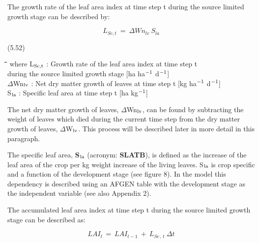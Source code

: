 The growth rate of the leaf area index at time step t during the source limited growth 
stage can be described by:

\begin{displaymath}
L _{Sc,t} ~=~\Delta Wn _{lv} ~S _{la} 
\end{displaymath}

 
\strut\hfill (5.52)
\nwln
\begin{tabbing}
\hspace{1.27cm}\=\hspace{1.27cm}\=\hspace{1.27cm}\=\hspace{1.27cm}\=%
\hspace{1.27cm}\=\hspace{1.27cm}\=\hspace{1.27cm}\=\hspace{1.27cm}\=%
\hspace{1.27cm}\=\hspace{1.27cm}\=\kill
where L$_{{\rm Sc,t}}$ : Growth rate of the leaf area index at time step t\\
   during the source limited growth stage         [ha ha$^{{\rm -1}}$ d$^{{\rm -1}}$]\\
$\Delta$Wn$_{{\rm lv}}$ : Net dry matter growth of leaves at time step t        [kg ha$^{{\rm -1}}$ d$^{{\rm -1}}$]\\
S$_{{\rm la}}$ : Specific leaf area at time step t        [ha kg$^{{\rm -1}}$]
\end{tabbing}

 
The net dry matter growth of leaves, $\Delta$Wn$_{{\rm lv}}$, can be found by subtracting the weight of
leaves which died during the current time step from the dry matter growth of leaves,
$\Delta$W$_{{\rm lv}}$. This process will be described later in more detail in this paragraph.


The specific leaf area, {\bf S$_{{\rm la}}$} (acronym: {\bf SLATB}), is defined as the increase of the leaf area
of the crop per kg weight increase of the living leaves. S$_{{\rm la}}$ is crop specific and a function
of the development stage (see figure 8). In the model this dependency is described using
an AFGEN table with the development stage as the independent variable (see also
Appendix 2).



 The accumulated leaf area index at time step t during the source limited growth stage can
be described as:

\begin{displaymath}
LAI _{t~} =~LAI _{t-1} ~+~L _{Sc\, ,\, t} ~\Delta t
\end{displaymath}

